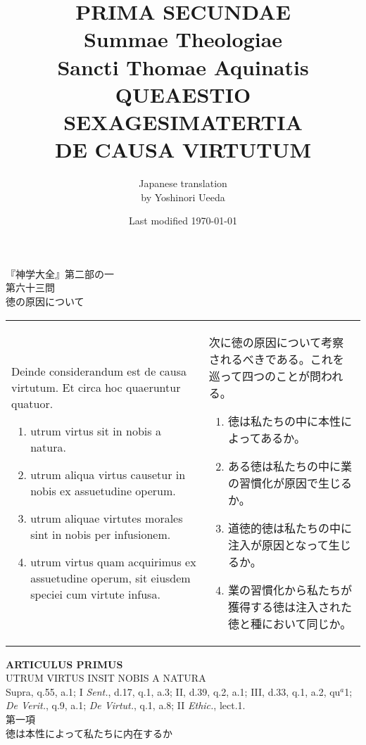 \documentclass[10pt]{jsarticle}
\title{{\bf PRIMA SECUNDAE}\\{\HUGE Summae Theologiae}\\Sancti Thomae
Aquinatis\\{\sffamily QUEAESTIO SEXAGESIMATERTIA}\\DE CAUSA VIRTUTUM}
\author{Japanese translation\\by Yoshinori {\sc Ueeda}}
\date{Last modified \today}
\begin{document}
\maketitle
\thispagestyle{empty}

\begin{center}
{\LARGE 『神学大全』第二部の一}\\
{\Large 第六十三問\\徳の原因について}
\end{center}

\begin{longtable}{p{21em}p{21em}}

Deinde considerandum est de causa virtutum. Et circa hoc quaeruntur
quatuor.

\begin{enumerate}
 \item utrum virtus sit in nobis a natura.
 \item utrum aliqua virtus causetur in nobis ex assuetudine operum.
 \item utrum aliquae virtutes morales sint in nobis per infusionem.
 \item utrum virtus quam acquirimus ex assuetudine operum, sit eiusdem
 speciei cum virtute infusa.
\end{enumerate}

&

次に徳の原因について考察されるべきである。これを巡って四つのことが問われる。

\begin{enumerate}
 \item 徳は私たちの中に本性によってあるか。
 \item ある徳は私たちの中に業の習慣化が原因で生じるか。
 \item 道徳的徳は私たちの中に注入が原因となって生じるか。
 \item 業の習慣化から私たちが獲得する徳は注入された徳と種において同じか。
\end{enumerate}
\end{longtable}

\newpage


\begin{center}
{\Large {\bf ARTICULUS PRIMUS}}\\
{\large UTRUM VIRTUS INSIT NOBIS A NATURA}\\
{\footnotesize Supra, q.55, a.1; I {\itshape Sent.}, d.17, q.1, a.3; II, d.39, q.2, a.1; III, d.33, q.1, a.2, qu$^{a}$1;\\ {\itshape De Verit.}, q.9, a.1; {\itshape De Virtut.}, q.1, a.8; II {\itshape Ethic.}, lect.1.}\\
{\Large 第一項\\徳は本性によって私たちに内在するか}
\end{center}
\end{document}
